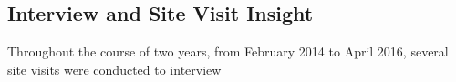 \subsection{Interview and Site Visit Insight}
\label{sec:sitevisit}
Throughout the course of two years, from February 2014 to April 2016, several site visits were conducted to interview